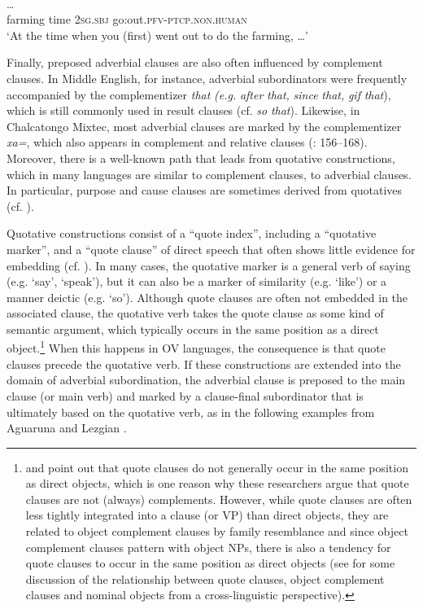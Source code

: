 \documentclass[output=paper]{langsci/langscibook}
\begin{document}
\ea\label{ex:diessel:14}
\\
 …\\
       farming  time   2\textsc{sg.sbj}  go:out.\textsc{pfv}-\textsc{ptcp.non.human} \\
\glt   `At the time when you (first) went out to do the farming, …'
\z

Finally, preposed adverbial clauses are also often influenced by complement clauses. In Middle English, for instance, adverbial subordinators were frequently accompanied by the complementizer \textit{that} \textit{(e.g.} \textit{after} \textit{that,} \textit{since} \textit{that,} \textit{gif} \textit{that}), which is still commonly used in result clauses (cf. \textit{so} \textit{that}). Likewise, in Chalcatongo Mixtec, most adverbial clauses are marked by the complementizer \textit{xa=}, which also appears in complement and relative clauses (\citealt{Macaulay1996}: 156--168). Moreover, there is a well-known path that leads from quotative constructions, which in many languages are similar to complement clauses, to adverbial clauses. In particular, purpose and cause clauses are sometimes derived from quotatives (cf. \citealt{Güldemann2008}). 

Quotative constructions consist of a “quote index”, including a “quotative marker”, and a “quote clause” of direct speech that often shows little evidence for embedding (cf. \citealt{Güldemann2008}). In many cases, the quotative marker is a general verb of saying (e.g. ‘say’, ‘speak’), but it can also be a marker of similarity (e.g. ‘like’) or a manner deictic (e.g. ‘so’). Although quote clauses are often not embedded in the associated clause, the quotative verb takes the quote clause as some kind of semantic argument, which typically occurs in the same position as a direct object.\footnote{\citet{Munro1982} and \citet{Güldemann2008} point out that quote clauses do not generally occur in the same position as direct objects, which is one reason why these researchers argue that quote clauses are not (always) complements. However, while quote clauses are often less tightly integrated into a clause (or VP) than direct objects, they are related to object complement clauses by family resemblance and since object complement clauses pattern with object NPs, there is also a tendency for quote clauses to occur in the same position as direct objects (see \citealt{Schmidtke-BodeDiessel2017} for some discussion of the relationship between quote clauses, object complement clauses and nominal objects from a cross-linguistic perspective).} When this happens in OV languages, the consequence is that quote clauses precede the quotative verb. If these constructions are extended into the domain of adverbial subordination, the adverbial clause is preposed to the main clause (or main verb) and marked by a clause-final subordinator that is ultimately based on the quotative verb, as in the following examples from Aguaruna  and Lezgian .
\end{document}
